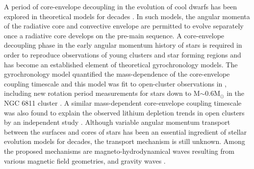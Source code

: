 A period of core-envelope decoupling in the evolution of cool dwarfs has been
explored in theoretical models for decades \citep[\eg][]{endal1981,
macgregor1991, denissenkov2010, gallet2013}.
In such models, the angular momenta of the radiative core and convective
envelope are permitted to evolve separately once a radiative core develops on
the pre-main sequence.
A core-envelope decoupling phase in the early angular momentum history of
stars is required in order to reproduce observations of young clusters and
star forming regions \citep[\eg][]{irwin2007, bouvier2008, denissenkov2010,
spada2011, reiners2012} and has become an established element of theoretical
gyrochronology models.
The \citet{lanzafame2015} gyrochronology model quantified the mass-dependence
of the core-envelope coupling timescale and this model was fit to open-cluster
observations in \citet{spada2019}, including new rotation period measurements
for stars down to M$\sim$0.6M$_\odot$ in the NGC 6811 cluster
\citep{curtis2019}.
A similar mass-dependent core-envelope coupling timescale was also found to
explain the observed lithium depletion trends in open clusters by an
independent study \citep{somers2016}.
Although variable angular momentum transport between the surfaces and cores of
stars has been an essential ingredient of stellar evolution models for
decades, the transport mechanism is still unknown.
Among the proposed mechanisms are magneto-hydrodynamical waves resulting from
various magnetic field geometries, and gravity waves \citep[see,
\eg][]{charbonneau1993, ruediger1996, spruit2002, talon2003, spada2010,
brun2011, oglethorpe2013}.

